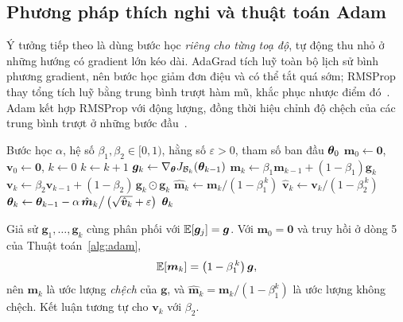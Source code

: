 \subsection{Phương pháp thích nghi và thuật toán Adam}
\label{subsec:adam}
 
Ý tưởng tiếp theo là dùng bước học \emph{riêng cho từng toạ độ}, tự động thu nhỏ
ở những hướng có gradient lớn kéo dài. AdaGrad tích luỹ toàn bộ lịch sử bình
phương gradient, nên bước học giảm đơn điệu và có thể tắt quá sớm; RMSProp thay
tổng tích luỹ bằng trung bình trượt hàm mũ, khắc phục nhược điểm
đó~\cite{goodfellow2016}. Adam kết hợp
RMSProp với động lượng, đồng thời hiệu chỉnh độ chệch của các trung bình trượt ở
những bước đầu~\cite{kingma2015}.
 
\begin{algorithm}[htbp]
\caption{Adam}
\label{alg:adam}
\begin{algorithmic}[1]
\Require Bước học $\alpha$, hệ số $\beta_1,\beta_2 \in [0,1)$, hằng số
  $\varepsilon > 0$, tham số ban đầu $\bm{\theta}_0$
\State $\bm{m}_0 \gets \bm{0}$, \quad $\bm{v}_0 \gets \bm{0}$, \quad $k \gets 0$
  \State $k \gets k+1$
  \State $\bm{g}_k \gets \nabla_{\bm{\theta}} J_{\mathcal{B}_k}(\bm{\theta}_{k-1})$
  \State $\bm{m}_k \gets \beta_1 \bm{m}_{k-1} + (1-\beta_1)\bm{g}_k$
  \State $\bm{v}_k \gets \beta_2 \bm{v}_{k-1}
    + (1-\beta_2)\, \bm{g}_k \odot \bm{g}_k$
  \State $\hat{\bm{m}}_k \gets \bm{m}_k / (1-\beta_1^{\,k})$
  \State $\hat{\bm{v}}_k \gets \bm{v}_k / (1-\beta_2^{\,k})$
  \State $\bm{\theta}_k \gets \bm{\theta}_{k-1} - \alpha\, \hat{\bm{m}}_k \big/
    \left(\sqrt{\hat{\bm{v}}_k} + \varepsilon\right)$
\EndWhile
\State \Return $\bm{\theta}_k$
\end{algorithmic}
\end{algorithm}
 
\begin{bode}
\label{bd:adam-bias}
Giả sử $\bm{g}_1,\dots,\bm{g}_k$ cùng phân phối với $\mathbb{E}[\bm{g}_j] = \bm{g}$. Với
$\bm{m}_0 = \bm{0}$ và truy hồi ở dòng 5 của Thuật toán~\ref{alg:adam},
\begin{equation}
\mathbb{E}[\bm{m}_k] = \left(1-\beta_1^{\,k}\right)\bm{g},
\label{eq:adam-bias}
\end{equation}
nên $\bm{m}_k$ là ước lượng \emph{chệch} của $\bm{g}$, và
$\hat{\bm{m}}_k = \bm{m}_k/(1-\beta_1^k)$ là ước lượng không chệch. Kết luận
tương tự cho $\bm{v}_k$ với $\beta_2$.
\end{bode}
 
